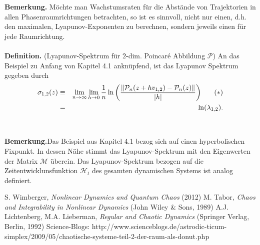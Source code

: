 \documentclass[11pt,a4paper]{article}
\begin{document}
\textbf{Bemerkung.} Möchte man Wachstumsraten für die Abstände von Trajektorien in allen Phasenraumrichtungen betrachten, so ist es sinnvoll, nicht nur einen, d.h. den maximalen, Lyapunov-Exponenten zu berechnen, sondern jeweils einen für jede Raumrichtung.
\\
\\
\textbf{Definition.} (Lyapunov-Spektrum für $ 2 $-dim. Poincar\'{e} Abbildung $ \mathcal{P} $) An das Beispiel zu Anfang von Kapitel 4.1 anknüpfend, ist das Lyapunov Spektrum gegeben durch
\begin{eqnarray}
\sigma_{1,2}(z) & \equiv & \lim_{n \to \infty} \lim_{h \to 0} \frac{1}{n} \ln \left(  \dfrac{\Vert \mathcal{P}_n ( z + h v_{1,2} ) - \mathcal{P}_n (z) \Vert}{\vert h \vert } \right)   \hspace{0,6cm} (\ast) \nonumber  \\
& = & \ln (  \lambda_{1,2} ). \nonumber
\end{eqnarray}
\\
\\
\textbf{Bemerkung.}Das Beispiel aus Kapitel 4.1 bezog sich auf einen hyperbolischen Fixpunkt. In dessen Nähe stimmt das Lyapunov-Spektrum mit den Eigenwerten der Matrix $ \mathcal{M} $ überein. Das Lyapunov-Spektrum bezogen auf die Zeitentwicklunsfunktion $ \mathscr{H}_t $ des gesamten dynamischen Systems ist analog definiert.



\begin{thebibliography}{xxxxxxxxxxxxxxxxxxx}
    S. Wimberger, \textit{Nonlinear Dynamics and Quantum Chaos} (2012)
    M. Tabor, \textit{Chaos and Integrability in Nonlinear Dynamics} (John Wiley & Sons, 1989)
    A.J. Lichtenberg, M.A. Lieberman, \textit{Regular and Chaotic Dynamics} (Springer Verlag, Berlin, 1992)
    Science-Blogs: http://www.scienceblogs.de/astrodic-ticum-simplex/2009/05/chaotische-systeme-teil-2-der-raum-als-donut.php
\end{thebibliography}
\end{document}
